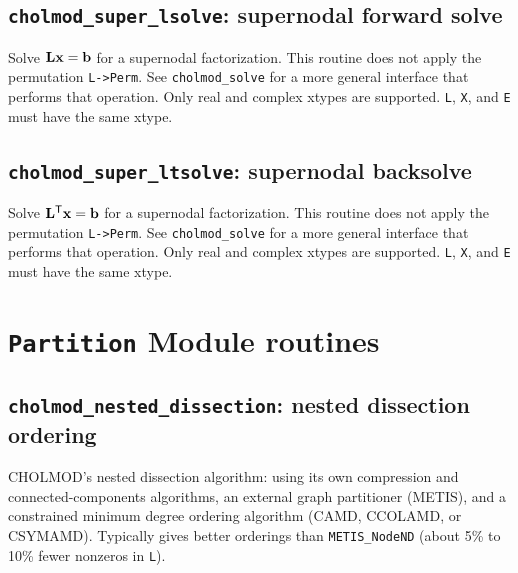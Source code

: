 \documentclass[11pt]{article}
\newcommand{\m}[1]{{\bf{#1}}}       %
\newcommand{\tr}{^{\sf T}}          %
\begin{document}
\subsection{{\tt cholmod\_super\_lsolve}: supernodal forward solve}


Solve $\m{Lx}=\m{b}$ for a supernodal factorization.  This routine does not
apply the permutation {\tt L->Perm}.  See {\tt cholmod\_solve} for a more
general interface that performs that operation.  Only real and complex xtypes
are supported.  {\tt L}, {\tt X}, and {\tt E} must have the same xtype.

\subsection{{\tt cholmod\_super\_ltsolve}: supernodal backsolve}


Solve $\m{L}\tr\m{x}=\m{b}$ for a supernodal factorization.  This routine does
not apply the permutation {\tt L->Perm}.  See {\tt cholmod\_solve} for a more
general interface that performs that operation.  Only real and complex xtypes
are supported.  {\tt L}, {\tt X}, and {\tt E} must have the same xtype.

\newpage \section{{\tt Partition} Module routines}

\subsection{{\tt cholmod\_nested\_dissection}: nested dissection ordering}


CHOLMOD's nested dissection algorithm: using its own compression and
connected-components algorithms, an external graph partitioner (METIS), and a
constrained minimum degree ordering algorithm (CAMD, CCOLAMD, or CSYMAMD).
Typically gives better orderings than {\tt METIS\_NodeND} (about 5\% to 10\%
fewer nonzeros in {\tt L}).
\end{document}
